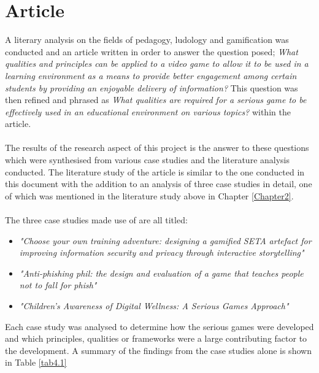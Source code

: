 \section{Article}
A literary analysis on the fields of pedagogy, ludology and gamification was conducted and an article written in order to answer the question posed; \textit{What qualities and principles can be applied to a video game to allow it to be used in a learning environment as a means to provide better engagement among certain students by providing an enjoyable delivery of information?} This question was then refined and phrased as \textit{What qualities are required for a serious game to be effectively used in an educational environment on various topics?} within the article.
\\\\
The results of the research aspect of this project is the answer to these questions which were synthesised from various case studies and the literature analysis conducted. The literature study of the article is similar to the one conducted in this document with the addition to an analysis of three case studies in detail, one of which was mentioned in the literature study above in Chapter \ref{Chapter2}.
\\\\
The three case studies made use of are all titled:
\begin{itemize}
\item \textit{"Choose your own training adventure: designing a gamified SETA artefact for improving information security and privacy through interactive storytelling"}
\item \textit{"Anti-phishing phil: the design and evaluation of a game that teaches people not to fall for phish"}
\item \textit{"Children’s Awareness of Digital Wellness: A Serious Games Approach"}
\end{itemize}

\noindent Each case study was analysed to determine how the serious games were developed and which principles, qualities or frameworks were a large contributing factor to the development. A summary of the findings from the case studies alone is shown in Table \ref{tab4.1}

